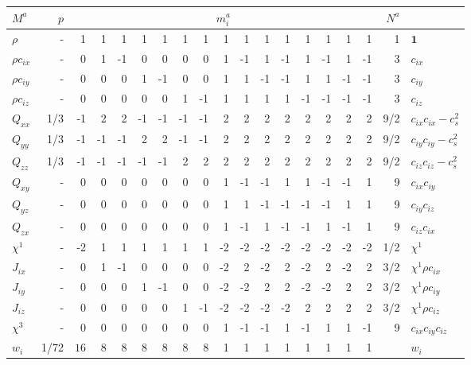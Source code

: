 \begin{table}[t]
\centering
\tabcolsep=4pt
\begin{tabular}{|l|r|r|rrrrrr|rrrrrrrr|r|l|}
\hline\hline
$M^a$ & $p$ & \multicolumn{15}{c|}{$m_i^a$} & $N^a$  &\\
\hline
$\rho$ & - &
 1 &  1 &  1 &  1 &  1 &  1 &  1 &  1 &  1 &  1 &  1 &  1 &  1 &  1 &  1 &
1 &$\mathbf{1}$ \\
\hline
$\rho c_{ix}$ & - &
 0 &  1 & -1 &  0 &  0 &  0 &  0 &  1 & -1 &  1 & -1 &  1 & -1 &  1 & -1 &
3  & $c_{ix}$ \\
\hline
$\rho c_{iy}$ & - &
 0 &  0 &  0 &  1 & -1 &  0 &  0 &  1 &  1 & -1 & -1 &  1 &  1 & -1 & -1 &
3  &$c_{iy}$ \\
\hline
$\rho c_{iz}$ & - &
 0 &  0 &  0 &  0 &  0 &  1 & -1 &  1 &  1 &  1 &  1 & -1 & -1 & -1 & -1 &
3  & $c_{iz}$ \\
\hline
$Q_{xx}$ & 1/3 &
-1 &  2 &  2 & -1 & -1 & -1 & -1 &  2 &  2 &  2 &  2 &  2 &  2 &  2 &  2 &
9/2  & $c_{ix} c_{ix} - c_s^2$ \\
\hline
$Q_{yy}$ & 1/3 &
-1 & -1 & -1 &  2 &  2 & -1 & -1 &  2 &  2 &  2 &  2 &  2 &  2 &  2 &  2 &
 9/2 & $c_{iy} c_{iy} - c_s^2$ \\
\hline
$Q_{zz}$ & 1/3 &
-1 & -1 & -1 & -1 & -1 &  2 &  2 &  2 &  2 &  2 &  2 &  2 &  2 &  2 &  2 &
 9/2 & $c_{iz} c_{iz} - c_s^2$ \\
\hline
$Q_{xy}$ & - &
 0 &  0 &  0 &  0 &  0 &  0 &  0 &  1 & -1 & -1 &  1 &  1 & -1 & -1 &  1 &
9  & $c_{ix} c_{iy}$ \\
\hline
$Q_{yz}$ & - &
 0 &  0 &  0 &  0 &  0 &  0 &  0 &  1 &  1 & -1 & -1 & -1 & -1 &  1 &  1 &
9  & $c_{iy} c_{iz}$ \\
\hline
$Q_{zx}$ & - &
 0 &  0 &  0 &  0 &  0 &  0 &  0 &  1 & -1 &  1 & -1 & -1 &  1 & -1 &  1 &
9  & $c_{iz} c_{ix}$ \\
\hline\hline
$\chi^1$ & - &
-2 &  1 &  1 &  1 &  1 &  1 &  1 & -2 & -2 & -2 & -2 & -2 & -2 & -2 & -2 &
1/2 & $\chi^1$ \\
\hline
$J_{ix}$ & - &
 0 &  1 & -1 &  0 &  0 &  0 &  0 & -2 &  2 & -2 &  2 & -2 &  2 & -2 &  2 &
3/2 & $\chi^1 \rho c_{ix}$\\
\hline
$J_{iy}$ & - &
 0 &   0 &  0 &  1 & -1 &  0 &  0 & -2 & -2 &  2 &  2 & -2 & -2 &  2 &  2 &
3/2 & $\chi^1 \rho c_{iy}$\\
\hline
$J_{iz}$ & - &
 0 &   0 &  0 &  0 &  0 &  1 & -1 & -2 & -2 & -2 & -2 &  2 &  2 &  2 &  2 &
3/2 & $\chi^1 \rho c_{iz}$\\
\hline
$\chi^3$ & - &
 0 &   0 &  0 &  0 &  0 &  0 &  0 &  1 & -1 & -1 &  1 & -1 &  1 &  1 & -1 &
9 & $c_{ix} c_{iy} c_{iz}$ \\
\hline\hline
$w_i$ & 1/72 &
$16$ & 8 & 8 & 8 & 8 & 8 & 8 & 1 & 1 & 1 & 1 & 1 & 1 & 1 & 1 &
 & $w_i$\\
\hline\hline
\end{tabular}


\end{table}
